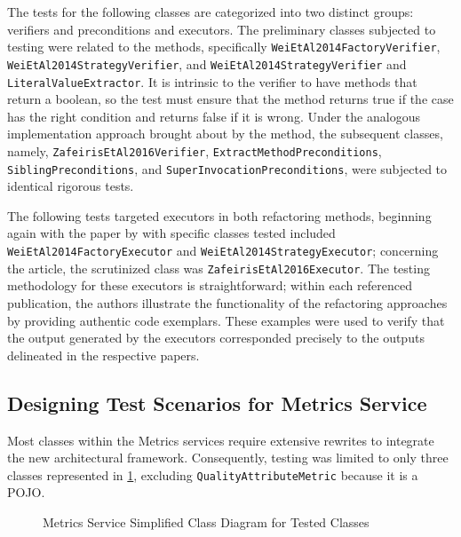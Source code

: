 The tests for the following classes are categorized into two distinct groups: verifiers and preconditions and executors. The preliminary classes subjected to testing were related to the \textcite{liu2014automated} methods, specifically \texttt{WeiEtAl2014FactoryVerifier}, \texttt{WeiEtAl2014StrategyVerifier}, and 	\texttt{WeiEtAl2014StrategyVerifier} and \texttt{LiteralValueExtractor}. It is intrinsic to the verifier to have methods that return a boolean, so the test must ensure that the method returns true if the case has the right condition and returns false if it is wrong. Under the analogous implementation approach brought about by the \textcite{zafeiris2017automated} method, the subsequent classes, namely, \texttt{ZafeirisEtAl2016Verifier}, \texttt{ExtractMethodPreconditions}, \texttt{SiblingPreconditions}, and \texttt{SuperInvocationPreconditions}, were subjected to identical rigorous tests.

The following tests targeted executors in both refactoring methods, beginning again with the paper by \textcite{liu2014automated} with specific classes tested included \texttt{WeiEtAl2014FactoryExecutor} and \texttt{WeiEtAl2014StrategyExecutor}; concerning the 	\textcite{zafeiris2017automated} article, the scrutinized class was \texttt{ZafeirisEtAl2016Executor}. The testing methodology for these executors is straightforward; within each referenced publication, the authors illustrate the functionality of the refactoring approaches by providing authentic code exemplars. These examples were used to verify that the output generated by the executors corresponded precisely to the outputs delineated in the respective papers.

\subsection{Designing Test Scenarios for Metrics Service}
\label{metrics-design-tests}

Most classes within the Metrics services require extensive rewrites to integrate the new architectural framework. Consequently, testing was limited to only three classes represented in \cref{fig-class-metrics-quality}, excluding \texttt{QualityAttributeMetric} because it is a POJO.

\begin{figure}[ht!]
\SetCaptionWidth{\textwidth}
\caption{Metrics Service Simplified Class Diagram for Tested Classes}
\label{fig-class-metrics-quality}

\end{figure}
\FloatBarrier


